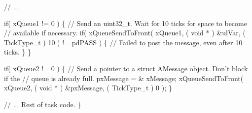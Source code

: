 \begin{DoxyPre}   // ...\end{DoxyPre}



\begin{DoxyPre}   if( xQueue1 != 0 )
   \{
    // Send an uint32\_t.  Wait for 10 ticks for space to become
    // available if necessary.
    if( xQueueSendToFront( xQueue1, ( void * ) \&ulVar, ( TickType\_t ) 10 ) != pdPASS )
    \{
        // Failed to post the message, even after 10 ticks.
    \}
   \}\end{DoxyPre}



\begin{DoxyPre}   if( xQueue2 != 0 )
   \{
    // Send a pointer to a struct AMessage object.  Don't block if the
    // queue is already full.
    pxMessage = \& xMessage;
    xQueueSendToFront( xQueue2, ( void * ) \&pxMessage, ( TickType\_t ) 0 );
   \}\end{DoxyPre}



\begin{DoxyPre}   // ... Rest of task code.
\}
\end{DoxyPre}
 